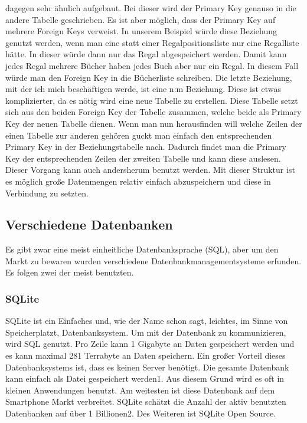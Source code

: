\documentclass[a4paper, 12pt]{article}
\theoremstyle{plain}
\theoremstyle{definition}
\begin{document}
dagegen sehr ähnlich aufgebaut. Bei dieser wird der Primary Key genauso in die andere Tabelle geschrieben. Es ist aber möglich, dass der Primary Key auf mehrere Foreign Keys verweist. In unserem Beispiel würde diese Beziehung genutzt werden, wenn man eine statt einer Regalpositionsliste nur eine Regalliste hätte. In dieser würde dann nur das Regal abgespeichert werden. Damit kann jedes Regal mehrere Bücher haben jedes Buch aber nur ein Regal. In diesem Fall würde man den Foreign Key in die Bücherliste schreiben. Die letzte Beziehung, mit der ich mich beschäftigen werde, ist eine n:m Beziehung. Diese ist etwas komplizierter, da es nötig wird eine neue Tabelle zu erstellen. Diese Tabelle setzt sich aus den beiden Foreign Key der Tabelle zusammen, welche beide als Primary Key der neuen Tabelle dienen. Wenn man nun herausfinden will welche Zeilen der einen Tabelle zur anderen gehören guckt man einfach den entsprechenden Primary Key in der Beziehungstabelle nach. Dadurch findet man die Primary Key der entsprechenden Zeilen der zweiten Tabelle und kann diese auslesen. Dieser Vorgang kann auch andersherum benutzt werden. Mit dieser Struktur ist es möglich große Datenmengen relativ einfach abzuspeichern und diese in Verbindung zu setzten.
	
	\subsection{Verschiedene Datenbanken}
	\label{sec:dbArten}
	
	Es gibt zwar eine meist einheitliche Datenbanksprache (SQL), aber um den Markt zu bewaren wurden verschiedene Datenbankmanagementsysteme erfunden. Es folgen zwei der meist benutzten.
	
	\subsubsection{SQLite}
	\label{sec:SQLite}
	SQLite ist ein Einfaches und, wie der Name schon sagt, leichtes, im Sinne von Speicherplatzt, Datenbanksystem. Um mit der Datenbank zu kommunizieren, wird SQL genutzt. Pro Zeile kann 1 Gigabyte an Daten gespeichert werden und es kann maximal 281 Terrabyte an Daten speichern. Ein großer Vorteil dieses Datenbanksystems ist, dass es keinen Server benötigt. Die gesamte Datenbank kann einfach als Datei gespeichert werden1. Aus diesem Grund wird es oft in kleinen Anwendungen benutzt. Am weitesten ist diese Datenbank auf dem Smartphone Markt verbreitet. SQLite schätzt die Anzahl der aktiv benutzten Datenbanken auf über 1 Billionen2. Des Weiteren ist SQLite Open Source.
	
\end{document}
